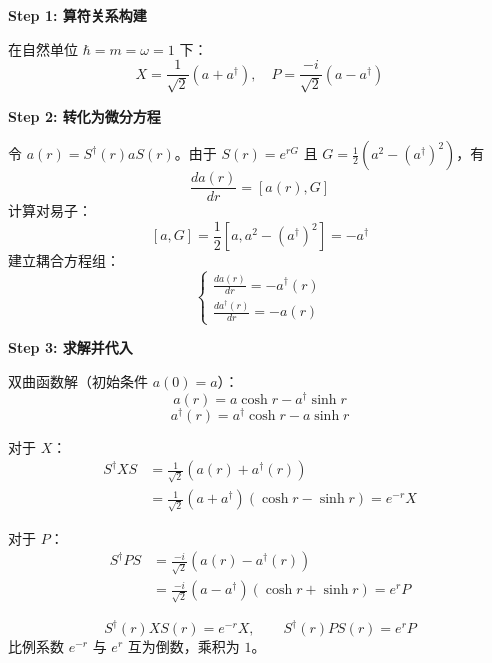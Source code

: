 \begin{derivationbox}[标准解题过程]
\textbf{Step 1: 算符关系构建}

在自然单位 $\hbar = m = \omega = 1$ 下：
\[
X = \frac{1}{\sqrt{2}}(a + a^\dagger), \quad P = \frac{-i}{\sqrt{2}}(a - a^\dagger)
\]

\textbf{Step 2: 转化为微分方程}

令 $a(r) = S^\dagger(r) a S(r)$。由于 $S(r) = e^{rG}$ 且 $G = \frac{1}{2}(a^2 - (a^\dagger)^2)$，有
\[
\frac{da(r)}{dr} = [a(r), G]
\]
计算对易子：
\[
[a, G] = \frac{1}{2}\left[ a, a^2 - (a^\dagger)^2 \right] = -a^\dagger
\]
建立耦合方程组：
\[
\begin{cases}
\displaystyle \frac{da(r)}{dr} = -a^\dagger(r) \\[6pt]
\displaystyle \frac{da^\dagger(r)}{dr} = -a(r)
\end{cases}
\]

\textbf{Step 3: 求解并代入}

双曲函数解（初始条件 $a(0)=a$）：
\[
a(r) = a\cosh r - a^\dagger \sinh r
\]
\[
a^\dagger(r) = a^\dagger \cosh r - a \sinh r
\]

对于 $X$：
\begin{align*}
S^\dagger X S &= \frac{1}{\sqrt{2}}(a(r) + a^\dagger(r)) \\
&= \frac{1}{\sqrt{2}}(a + a^\dagger)(\cosh r - \sinh r) = e^{-r} X
\end{align*}

对于 $P$：
\begin{align*}
S^\dagger P S &= \frac{-i}{\sqrt{2}}(a(r) - a^\dagger(r)) \\
&= \frac{-i}{\sqrt{2}}(a - a^\dagger)(\cosh r + \sinh r) = e^{r} P
\end{align*}
\end{derivationbox}

\begin{formulabox}[核心结论]
\[
S^\dagger(r) X S(r) = e^{-r} X, \qquad S^\dagger(r) P S(r) = e^{r} P
\]
比例系数 $e^{-r}$ 与 $e^{r}$ 互为倒数，乘积为 $1$。
\end{formulabox}

